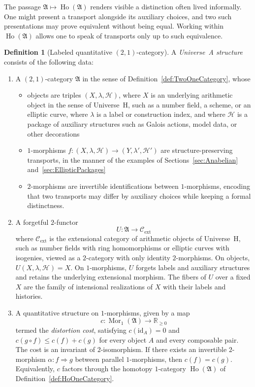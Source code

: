 \documentclass[10pt, reqno]{amsart}
\theoremstyle{plain}
\theoremstyle{definition}
\newtheorem{definition}[theorem]{Definition}
\theoremstyle{plain}
\newcommand{\R}{\mathbb{R}}
\newcommand{\Ho}{\operatorname{Ho}}
\begin{document}
The passage $\mathfrak{A} \mapsto \Ho(\mathfrak{A})$ renders visible a distinction often lived informally. One might present a transport alongside its auxiliary choices, and two such presentations may prove equivalent without being equal. Working within $\Ho(\mathfrak{A})$ allows one to speak of transports only up to such equivalence.

\begin{definition}[Labeled quantitative $(2,1)$-category]\label{def:UniverseAFormal}
A \emph{Universe~A structure} consists of the following data:

\begin{enumerate}
\item[(i)] A $(2,1)$-category $\mathfrak{A}$ in the sense of Definition~\ref{def:TwoOneCategory}, whose
  \begin{itemize}
\item objects are triples $(X,\lambda,\mathcal{H})$, where $X$ is an underlying arithmetic object in the sense of Universe~H, such as a number field, a scheme, or an elliptic curve, where $\lambda$ is a label or construction index, and where $\mathcal{H}$ is a package of auxiliary structures such as Galois actions, model data, or other decorations
\item $1$-morphisms $f \colon (X,\lambda,\mathcal{H}) \to (Y,\lambda',\mathcal{H}')$ are structure-preserving transports, in the manner of the examples of Sections~\ref{sec:Anabelian} and~\ref{sec:EllipticPackages}
\item $2$-morphisms are invertible identifications between $1$-morphisms, encoding that two transports may differ by auxiliary choices while keeping a formal distinctness.
  \end{itemize}

\item[(ii)] A forgetful $2$-functor
  \[
    U \colon \mathfrak{A} \longrightarrow \mathcal{C}_{\mathrm{ext}}
  \]
where $\mathcal{C}_{\mathrm{ext}}$ is the extensional category of arithmetic objects of Universe~H, such as number fields with ring homomorphisms or elliptic curves with isogenies, viewed as a $2$-category with only identity $2$-morphisms. On objects, $U(X,\lambda,\mathcal{H}) = X$. On $1$-morphisms, $U$ forgets labels and auxiliary structures and retains the underlying extensional morphism. The fibers of $U$ over a fixed $X$ are the family of intensional realizations of $X$ with their labels and histories.

\item[(iii)] A quantitative structure on $1$-morphisms, given by a map
  \[
    c \colon \operatorname{Mor}_1(\mathfrak{A}) \longrightarrow \R_{\ge 0}
  \]
termed the \emph{distortion cost}, satisfying $c(\mathrm{id}_A) = 0$ and $c(g \circ f) \le c(f) + c(g)$ for every object $A$ and every composable pair. The cost is an invariant of $2$-isomorphism. If there exists an invertible $2$-morphism $\alpha \colon f \Rightarrow g$ between parallel $1$-morphisms, then $c(f) = c(g)$. Equivalently, $c$ factors through the homotopy $1$-category $\Ho(\mathfrak{A})$ of Definition~\ref{def:HoOneCategory}.


\end{enumerate}
\end{definition}
\end{document}
